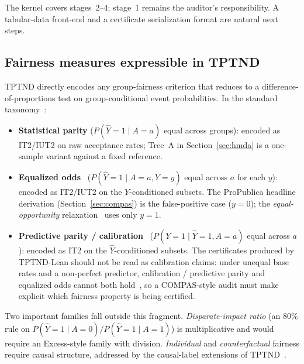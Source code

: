 \documentclass{ceurart}
\begin{document}
The kernel covers stages~2--4; stage~1 remains the auditor's
responsibility.  A tabular-data front-end and a certificate
serialization format are natural next steps.

\subsection{Fairness measures expressible in TPTND}\label{sec:measures}

TPTND directly encodes any group-fairness criterion that reduces
to a difference-of-proportions test on group-conditional event
probabilities.  In the standard
taxonomy~\cite{barocas2019fairness}:

\begin{itemize}
\item \textbf{Statistical parity} ($P(\hat Y{=}1\mid A{=}a)$
  equal across groups): encoded as \textsc{IT2}/\textsc{IUT2}
  on raw acceptance rates; Tree~A in Section~\ref{sec:hmda} is
  a one-sample variant against a fixed reference.
\item \textbf{Equalized odds}~\cite{hardt2016equality}
  ($P(\hat Y{=}1\mid A{=}a, Y{=}y)$ equal across $a$ for each
  $y$): encoded as \textsc{IT2}/\textsc{IUT2} on the
  $Y$-conditioned subsets.  The ProPublica headline derivation
  (Section~\ref{sec:compas}) is the false-positive case
  ($y{=}0$); the \emph{equal-opportunity}
  relaxation~\cite{hardt2016equality} uses only $y{=}1$.
\item \textbf{Predictive parity / calibration}~\cite{chouldechova2017fair}
  ($P(Y{=}1\mid \hat Y{=}1, A{=}a)$ equal across $a$): encoded
  as \textsc{IT2} on the $\hat Y$-conditioned subsets.
  The certificates produced by TPTND-Lean should not be read as
  calibration claims: under unequal base rates and a non-perfect
  predictor, calibration / predictive parity and equalized odds
  cannot both hold~\cite{chouldechova2017fair}, so a
  COMPAS-style audit must make explicit which fairness property
  is being certified.
\end{itemize}

\noindent
Two important families fall outside this fragment.
\emph{Disparate-impact ratio} (an $80\%$ rule on
$P(\hat Y{=}1\mid A{=}0)/P(\hat Y{=}1\mid A{=}1)$) is
multiplicative and would require an Excess-style family with
division.  \emph{Individual} and \emph{counterfactual}
fairness require causal structure, addressed by the
causal-label extensions of
TPTND~\cite{ceragioli2025causal1,ceragioli2025causal2}.

\end{document}
